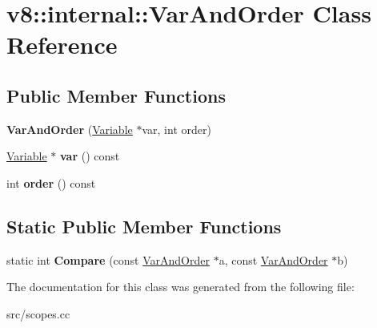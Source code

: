 \hypertarget{classv8_1_1internal_1_1_var_and_order}{}\section{v8\+:\+:internal\+:\+:Var\+And\+Order Class Reference}
\label{classv8_1_1internal_1_1_var_and_order}
\subsection*{Public Member Functions}
\begin{DoxyCompactItemize}
\item 
\hypertarget{classv8_1_1internal_1_1_var_and_order_ad43de731abbef8100cc41064fda838b4}{}{\bfseries Var\+And\+Order} (\hyperlink{classv8_1_1internal_1_1_variable}{Variable} $\ast$var, int order)\label{classv8_1_1internal_1_1_var_and_order_ad43de731abbef8100cc41064fda838b4}

\item 
\hypertarget{classv8_1_1internal_1_1_var_and_order_adaa15744d60f0adbe432baed1e0e69c7}{}\hyperlink{classv8_1_1internal_1_1_variable}{Variable} $\ast$ {\bfseries var} () const \label{classv8_1_1internal_1_1_var_and_order_adaa15744d60f0adbe432baed1e0e69c7}

\item 
\hypertarget{classv8_1_1internal_1_1_var_and_order_a97c3d6eb71fd5c6a23b5df80cc53a9c8}{}int {\bfseries order} () const \label{classv8_1_1internal_1_1_var_and_order_a97c3d6eb71fd5c6a23b5df80cc53a9c8}

\end{DoxyCompactItemize}
\subsection*{Static Public Member Functions}
\begin{DoxyCompactItemize}
\item 
\hypertarget{classv8_1_1internal_1_1_var_and_order_a21508ec7f6ed8ba56ca6b9f88cb3b0e5}{}static int {\bfseries Compare} (const \hyperlink{classv8_1_1internal_1_1_var_and_order}{Var\+And\+Order} $\ast$a, const \hyperlink{classv8_1_1internal_1_1_var_and_order}{Var\+And\+Order} $\ast$b)\label{classv8_1_1internal_1_1_var_and_order_a21508ec7f6ed8ba56ca6b9f88cb3b0e5}

\end{DoxyCompactItemize}


The documentation for this class was generated from the following file\+:\begin{DoxyCompactItemize}
\item 
src/scopes.\+cc\end{DoxyCompactItemize}
